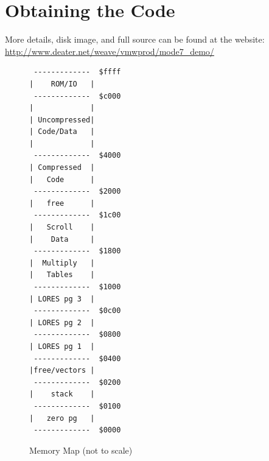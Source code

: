 \documentclass[twocolumn]{article}
\begin{document}
\section{Obtaining the Code}

More details, disk image, and full source can be found at the website:
\url{http://www.deater.net/weave/vmwprod/mode7_demo/}



\begin{figure}
\begin{center}
\begin{scriptsize}
\begin{BVerbatim}
 -------------  $ffff
|    ROM/IO   |
 -------------  $c000
|             |
| Uncompressed|
| Code/Data   |
|             |
 -------------  $4000
| Compressed  |
|   Code      |
 -------------  $2000
|   free      |
 -------------  $1c00
|   Scroll    |
|    Data     |
 -------------  $1800
|  Multiply   |
|   Tables    |	
 -------------  $1000
| LORES pg 3  |
 -------------  $0c00
| LORES pg 2  |
 -------------  $0800
| LORES pg 1  |
 -------------  $0400
|free/vectors |
 -------------  $0200
|    stack    |
 -------------  $0100
|   zero pg   |
 -------------  $0000
\end{BVerbatim}
\end{scriptsize}
\end{center}
\caption{Memory Map (not to scale)\label{fig:map}}
\end{figure}
\end{document}
